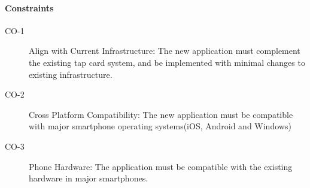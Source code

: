 \paragraph{Constraints}\begin{description}
	\item[CO-1] Align with Current Infrastructure: The new application must complement the existing tap card system, and be implemented with minimal changes to existing infrastructure. 
	\item[CO-2] Cross Platform Compatibility: The new application must be compatible with major smartphone operating systems(iOS, Android and Windows)
	\item[CO-3] Phone Hardware: The application must be compatible with the existing hardware in major smartphones.

\end{description}
